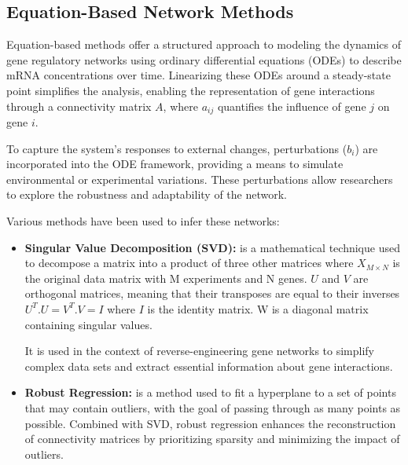 \subsection{Equation-Based Network Methods}\label{subsec:equation-based-network-methods}
Equation-based methods offer a structured approach to modeling the dynamics of gene regulatory networks using ordinary differential equations (ODEs) to describe mRNA concentrations over time.
Linearizing these ODEs around a steady-state point simplifies the analysis, enabling the representation of gene interactions through a connectivity matrix \(A\), where \(a_{ij}\) quantifies the influence of gene \(j\) on gene \(i\)\cite{deng_molecular_2012}.


\noindent To capture the system's responses to external changes, perturbations (\(b_i\)) are incorporated into the ODE framework, providing a means to simulate environmental or experimental variations\cite{yeung_reverse_2002}.
These perturbations allow researchers to explore the robustness and adaptability of the network.

\newpage
\noindent Various methods have been used to infer these networks:

\begin{itemize}

    \item \textbf{Singular Value Decomposition (SVD):} is a mathematical technique used to decompose a matrix into a product of three other matrices where
    \subitem $X_{M\times N}$ is the original data matrix with M experiments and N genes.
    \subitem $U$ and $V$ are orthogonal matrices, meaning that their transposes are equal to their inverses
    \subitem $U^T.U=V^T.V=I$ where $I$ is the identity matrix.
    \subitem W is a diagonal matrix containing singular values.

    It is used in the context of reverse-engineering gene networks to simplify complex data sets and extract essential information about gene interactions\cite{yeung_reverse_2002}.

    \item \textbf{Robust Regression:} is a method used to fit a hyperplane to a set of points that may contain outliers, with the goal of passing through as many points as possible.
    Combined with SVD, robust regression enhances the reconstruction of connectivity matrices by prioritizing sparsity and minimizing the impact of outliers\cite{yeung_reverse_2002}.

\end{itemize}


